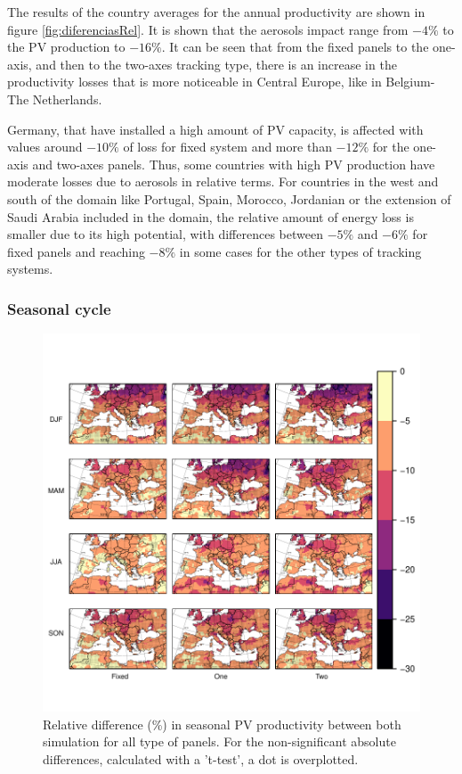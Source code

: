 The results of the country averages for the annual productivity are shown in figure \ref{fig:diferenciasRel}. It is shown that the aerosols impact range from $-4\%$ to the PV production to $-16\%$. It can be seen that from the fixed panels to the one-axis, and then to the two-axes tracking type, there is an increase in the productivity losses that is more noticeable in Central Europe, like in Belgium-The Netherlands.

Germany, that have installed a high amount of PV capacity, is affected with values around $-10\%$ of loss for fixed system and more than $-12\%$ for the one-axis and two-axes panels. Thus, some countries with high PV production have moderate losses due to aerosols in relative terms. For countries in the west and south of the domain like Portugal, Spain, Morocco, Jordanian or the extension of Saudi Arabia included in the domain, the relative amount of energy loss is smaller due to its high potential, with differences between $-5\%$ and $-6\%$ for fixed panels and reaching $-8\%$ in some cases for the other types of tracking systems.

\subsubsection{Seasonal cycle}

\begin{figure}[h!]
  \centering
  \includegraphics[width=1\textwidth]{figs/capitulo6/RelDif_aer_no_all20032009SIGt.pdf}
\caption{Relative difference (\%) in seasonal PV productivity between both simulation for all type of panels. For the non-significant absolute differences, calculated with a 't-test', a dot is overplotted.}
\label{mapas}
\end{figure}


